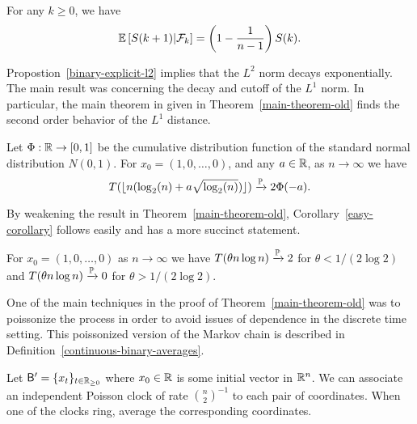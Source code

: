 \documentclass[12pt]{article}
\begin{document}
\begin{prop} \label{binary-explicit-l2}
	For any $k \geq 0$, we have 
	\[
		\mathbb{E} \left [ S(k+1) | \mathcal{F}_k \right ] = \left ( 1 - \frac{1}{n-1} \right ) S(k).
	\]	
\end{prop}

Propostion~\ref{binary-explicit-l2} implies that the $L^2$ norm decays exponentially. The main result \cite{chatterjee2021phase} was concerning the decay and cutoff of the $L^1$ norm. In particular, the main theorem in \cite{chatterjee2021phase} given in Theorem~\ref{main-theorem-old} finds the second order behavior of the $L^1$ distance. 

\begin{thm} \label{main-theorem-old}
	Let $\Phi : \mathbb{R} \to [0, 1]$ be the cumulative distribution function of the standard normal distribution $N(0, 1)$. For $x_0 = (1, 0, \ldots, 0)$, and any $a \in \mathbb{R}$, as $n \to \infty$ we have 
	\[
		T(\lfloor n(\log_2(n) + a \sqrt{\log_2(n)}) \rfloor) \xrightarrow{\mathbb{P}} 2 \Phi(-a).
	\]
\end{thm}

By weakening the result in Theorem~\ref{main-theorem-old}, Corollary~\ref{easy-corollary} follows easily and has a more succinct statement. 

\begin{cor} \label{easy-corollary}
	For $x_0 = (1, 0, \ldots, 0)$ as $n \to \infty$ we have $T(\theta n \log n) \xrightarrow{\mathbb{P}} 2$ for $\theta < 1/(2 \log 2)$ and $T(\theta n \log n) \xrightarrow{\mathbb{P}} 0$ for $\theta > 1/(2 \log 2)$. 
\end{cor}

One of the main techniques in the proof of Theorem~\ref{main-theorem-old} was to poissonize the process in order to avoid issues of dependence in the discrete time setting. This poissonized version of the Markov chain is described in Definition~\ref{continuous-binary-averages}. 

\begin{defn} \label{continuous-binary-averages}
	Let $\mathsf{B}' = \{x_t\}_{t \in \mathbb{R}_{\geq 0}}$ where $x_0 \in \mathbb{R}$ is some initial vector in $\mathbb{R}^n$. We can associate an independent Poisson clock of rate $\binom{n}{2}^{-1}$ to each pair of coordinates. When one of the clocks ring, average the corresponding coordinates.  
\end{defn}
\end{document}
